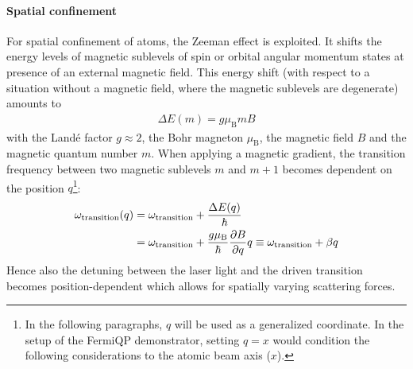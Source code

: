 \paragraph{Spatial confinement} For spatial confinement of atoms, the Zeeman effect is exploited. It shifts the energy levels of magnetic sublevels of spin or orbital angular momentum states at presence of an external magnetic field. This energy shift (with respect to a situation without a magnetic field, where the magnetic sublevels are degenerate) amounts to
\begin{align}
    \Delta E(m) = g \mu_\text{B} m B
\end{align}
with the Landé factor $g \approx 2$, the Bohr magneton $\mu_\text{B}$, the magnetic field $B$ and the magnetic quantum number $m$. When applying a magnetic gradient, the transition frequency between two magnetic sublevels $m$ and $m + 1$ becomes dependent on the position $q$\footnote{In the following paragraphs, $q$ will be used as a generalized coordinate. In the setup of the FermiQP demonstrator, setting $q = x$ would condition the following considerations to the atomic beam axis ($x$).}:
\begin{equation}
    \begin{split}\label{eq:omega_transition_zeeman}
      \omega_\text{transition}(q) &= \omega_\text{transition} + \frac{\Delta E(q)}{\hbar} \\  
      &= \omega_\text{transition} + \frac{g \mu_\text{B}}{\hbar} \pdv{B}{q} q \equiv \omega_\text{transition} + \beta q
    \end{split}
\end{equation}
Hence also the detuning between the laser light and the driven transition becomes position-dependent which allows for spatially varying scattering forces.


